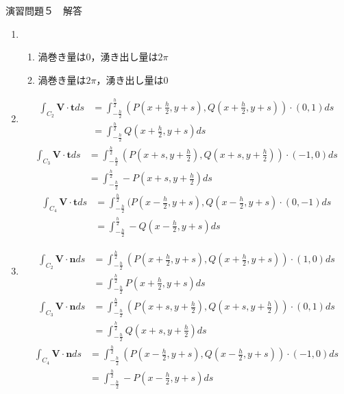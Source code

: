 \documentclass{jarticle}
\begin{document}
\begin{center} {\Large 演習問題５　解答} \end{center}
  \begin{enumerate}
    \item
      \begin{enumerate}
        \item
          渦巻き量は$0$，湧き出し量は$2\pi$
        \item
          渦巻き量は$2\pi$，湧き出し量は$0$

      \end{enumerate}
    \item
    \begin{align}
\int_{C_{2}}\bm V \cdot \bm t ds&=\int_{-\frac{h}{2}}^{\frac{h}{2}}(P(x+\frac{h}{2}, y+s), Q(x+\frac{h}{2}, y+s)) \cdot (0,1) ds
\\
&=\int_{-\frac{h}{2}}^{\frac{h}{2}}Q(x+\frac{h}{2}, y+s)ds
\end{align}
    \begin{align}
\int_{C_{3}}\bm V \cdot \bm t ds&=\int_{-\frac{h}{2}}^{\frac{h}{2}}(P(x+s, y+\frac{h}{2}), Q(x+s, y+\frac{h}{2})) \cdot (-1,0) ds
\\
&=\int_{-\frac{h}{2}}^{\frac{h}{2}}-P(x+s, y+\frac{h}{2})ds
\end{align}
    \begin{align}
\int_{C_{4}}\bm V \cdot \bm t ds&=\int_{-\frac{h}{2}}^{\frac{h}{2}}(P(x-\frac{h}{2}, y+s), Q(x-\frac{h}{2}, y+s) \cdot (0,-1) ds
\\
&=\int_{-\frac{h}{2}}^{\frac{h}{2}}-Q(x-\frac{h}{2}, y+s)ds
\end{align}
    \item
    \begin{align}
\int_{C_{2}}\bm V \cdot \bm n ds&=\int_{-\frac{h}{2}}^{\frac{h}{2}}(P(x+\frac{h}{2}, y+s), Q(x+\frac{h}{2}, y+s)) \cdot (1,0) ds
\\
&=\int_{-\frac{h}{2}}^{\frac{h}{2}}P(x+\frac{h}{2}, y+s)ds
\end{align}
    \begin{align}
\int_{C_{3}}\bm V \cdot \bm n ds&=\int_{-\frac{h}{2}}^{\frac{h}{2}}(P(x+s, y+\frac{h}{2}), Q(x+s, y+\frac{h}{2})) \cdot (0,1) ds
\\
&=\int_{-\frac{h}{2}}^{\frac{h}{2}}Q(x+s, y+\frac{h}{2})ds
\end{align}
    \begin{align}
\int_{C_{4}}\bm V \cdot \bm n ds&=\int_{-\frac{h}{2}}^{\frac{h}{2}}(P(x-\frac{h}{2}, y+s), Q(x-\frac{h}{2}, y+s)) \cdot (-1,0) ds
\\
&=\int_{-\frac{h}{2}}^{\frac{h}{2}}-P(x-\frac{h}{2}, y+s)ds
\end{align}
  

\end{enumerate}
\end{document}
